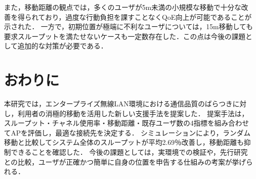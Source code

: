 \documentclass[dvipdfmx,twocolumn]{jsarticle}
\newcommand{\Note}[1]{\noindent \textbf{\textcolor{blue}{#1}}}
\begin{document}
また，移動距離の観点では，多くのユーザが5m未満の小規模な移動で十分な改善を得られており，過度な行動負担を課すことなくQoE向上が可能であることが示された．
一方で，初期位置が極端に不利なユーザについては，15m移動しても要求スループットを満たせないケースも一定数存在した．この点は今後の課題として追加的な対策が必要である．

\section{おわりに}
本研究では，エンタープライズ無線LAN環境における通信品質のばらつきに対し，利用者の消極的移動を活用した新しい支援手法を提案した．
提案手法は，スループット・チャネル使用率・移動距離・既存ユーザ数の4指標を組み合わせてAPを評価し，最適な接続先を決定する．
シミュレーションにより，ランダム移動と比較してシステム全体のスループットが平均2.69％改善し，移動距離も抑制できることを確認した．
今後の課題としては，実環境での検証や，先行研究との比較，ユーザが正確かつ簡単に自身の位置を申告する仕組みの考案が挙げられる．



\end{document}
